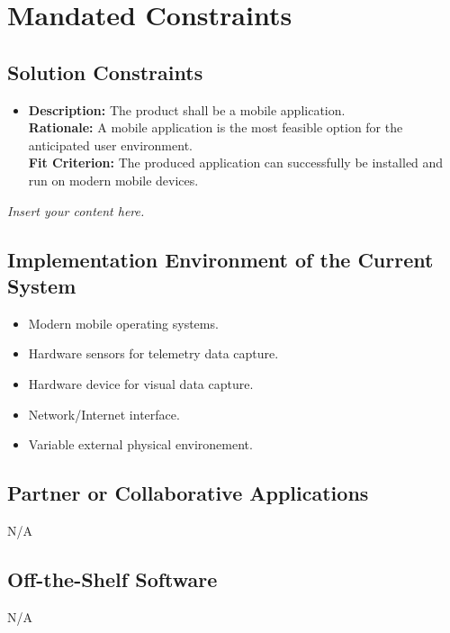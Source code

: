 \documentclass[12pt]{article}
\newcommand{\lips}{\textit{Insert your content here.}}
\begin{document}
\section{Mandated Constraints}
\subsection{Solution Constraints}
\begin{itemize}
  \item \textbf{Description:} The product shall be a mobile application. \\
        \textbf{Rationale:} A mobile application is the most feasible option for the anticipated user environment. \\
        \textbf{Fit Criterion:} The produced application can successfully be installed and run on modern mobile devices.

\end{itemize}
\lips
\subsection{Implementation Environment of the Current System}
\begin{itemize}
  \item Modern mobile operating systems.
  \item Hardware sensors for telemetry data capture.
  \item Hardware device for visual data capture.
  \item Network/Internet interface.
  \item Variable external physical environement.
\end{itemize}
\subsection{Partner or Collaborative Applications}
N/A %
\subsection{Off-the-Shelf Software}
N/A %
\end{document}
